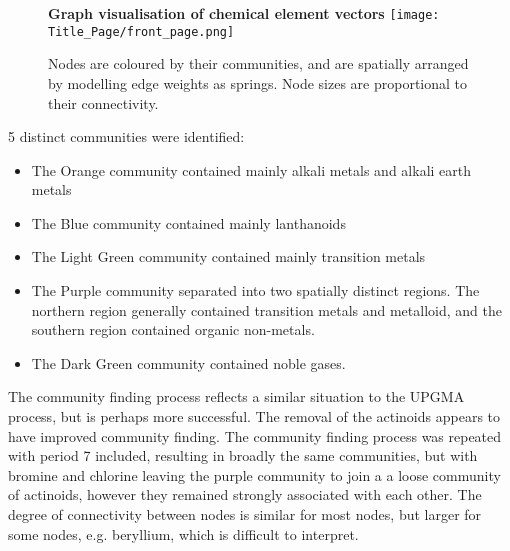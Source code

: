 \begin{center}
\begin{figure}[H]
  \centering
  \textbf{Graph visualisation of chemical element vectors}
    \texttt{[image: Title\_Page/front\_page.png]}
    \caption[Graph visualisation of chemical element vectors]{Nodes are coloured by their communities, and are spatially arranged by modelling edge weights as springs. Node sizes are proportional to their connectivity. }
    \label{fig:elems_graph}
\end{figure} 
\end{center}
5 distinct communities were identified:
\begin{itemize}
\item The Orange community contained mainly alkali metals and alkali earth metals
\item The Blue community contained mainly lanthanoids
\item The Light Green community contained mainly transition metals
\item The Purple community separated into two spatially distinct regions. The northern region generally contained transition metals and metalloid, and the southern region contained organic non-metals.
\item The Dark Green community contained noble gases.
\end{itemize}
The community finding process reflects a similar situation to the UPGMA process, but is perhaps more successful. The removal of the actinoids appears to have improved community finding. The community finding process was repeated with period 7 included, resulting in broadly the same communities, but with bromine and chlorine leaving the purple community to join a a loose community of actinoids, however they remained strongly associated with each other. The degree of connectivity between nodes is similar for most nodes, but larger for some nodes, e.g. beryllium, which is difficult to interpret. 

